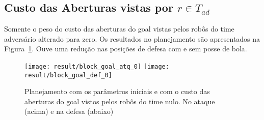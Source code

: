 \subsection{Custo das Aberturas vistas por $r \in T_{ad}$}
Somente o peso do custo das aberturas do goal vistas pelos robôs do time
adversário alterado para zero. Os resultados no planejamento são
apresentados na Figura~\ref{fig:block_goal_0}. Ouve uma redução nas
posições de defesa com e sem posse de bola.

\begin{figure}[H]
  \centering
  \texttt{[image: result/block\_goal\_atq\_0]}
  \texttt{[image: result/block\_goal\_def\_0]}
  \caption{Planejamento com os parâmetros iniciais e com o custo
           das aberturas do goal vistos pelos robôs do time nulo.
           No ataque (acima) e na defesa (abaixo)}\label{fig:block_goal_0}
\end{figure}
